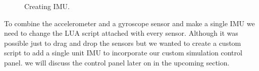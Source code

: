 \begin{figure}[h!]
    \centering
        \quad
        \caption{Creating IMU.}
        \label{fig:creating_IMU}
    \end{figure}

To combine the accelerometer and a gyroscope sensor and make a single IMU we need to change the LUA script attached with every sensor. Although it was possible just to drag and drop the sensors but we wanted to create a custom script to add a single unit IMU to incorporate our custom simulation control panel. we will discuss the control panel later on in the upcoming section. 

